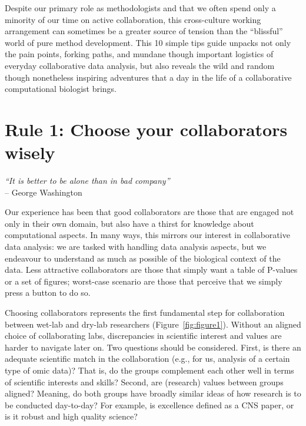 \documentclass{article}
\begin{document}
Despite our primary role as methodologists and that we often spend only a minority of our time on active collaboration, this cross-culture working arrangement can sometimes be a greater source of tension than the ``blissful'' world of pure method development. This 10 simple tips guide unpacks not only the pain points, forking paths, and mundane though important logistics of everyday collaborative data analysis, but also reveals the wild and random though nonetheless inspiring adventures that a day in the life of a collaborative computational biologist brings.

\clearpage

\section*{Rule 1: Choose your collaborators wisely} %
\label{rule1_choose}

\begin{flushright}
\rightskip=1cm\textit{``It is better to be alone than in bad company''} \\
\vspace{.2em}
\rightskip=0cm -- George Washington
\end{flushright}

Our experience has been that good collaborators are those that are engaged not only in their own domain, but also have a thirst for knowledge about computational aspects. In many ways, this mirrors our interest in collaborative data analysis: we are tasked with handling data analysis aspects, but we endeavour to understand as much as possible of the biological context of the data. Less attractive collaborators are those that simply want a table of P-values or a set of figures; worst-case scenario are those that perceive that we simply press a button to do so. 

Choosing collaborators represents the first fundamental step for collaboration between wet-lab and dry-lab researchers (Figure~\ref{fig:figure1}). Without an aligned choice of collaborating labs, discrepancies in scientific interest and values are harder to navigate later on. Two questions should be considered. First, is there an adequate scientific match in the collaboration (e.g., for us, analysis of a certain type of omic data)? That is, do the groups complement each other well in terms of scientific interests and skills? Second, are (research) values between groups aligned? Meaning, do both groups have broadly similar ideas of how research is to be conducted day-to-day? For example, is excellence defined as a CNS paper, or is it robust and high quality science?
\end{document}
